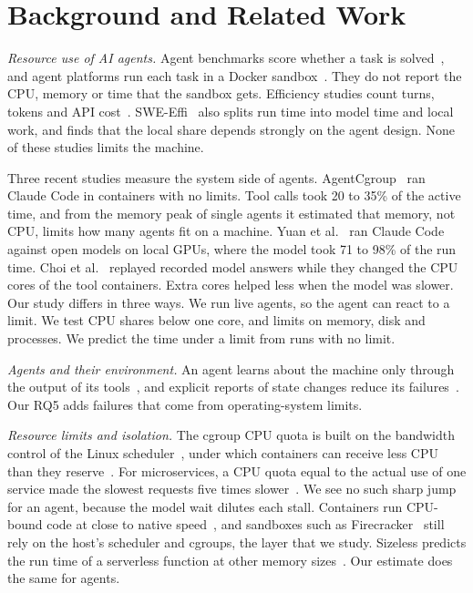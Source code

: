 \documentclass[sigconf,review,anonymous]{acmart}
\begin{document}
\section{Background and Related Work}



\emph{Resource use of AI agents.} Agent benchmarks score whether a task
is solved~\cite{jimenez2024,swebenchverified}, and agent platforms run
each task in a Docker sandbox~\cite{yang2024,wang2025}. They do not
report the CPU, memory or time that the sandbox gets. Efficiency studies
count turns, tokens and API cost~\cite{gao2026,lindenbauer2025,fan2025}.
SWE-Effi~\cite{fan2025} also splits run time into model time and local
work, and finds that the local share depends strongly on the agent
design. None of these studies limits the machine.

Three recent studies measure the system side of agents. AgentCgroup~\cite{agentcgroup} ran Claude Code
in containers with no limits. Tool calls took 20 to 35\% of the active
time, and from the memory peak of single agents it estimated that
memory, not CPU, limits how many agents fit on a machine. Yuan et
al.~\cite{yuan2026} ran Claude Code against open models on local GPUs,
where the model took 71 to 98\% of the run time. Choi et
al.~\cite{choi2026} replayed recorded model answers while they changed
the CPU cores of the tool containers. Extra cores helped less when the
model was slower. Our study differs in three ways. We run live agents, so the agent
can react to a limit. We test CPU shares below one core, and limits on
memory, disk and processes. We predict the time under a limit from runs
with no limit.

\emph{Agents and their environment.} An agent learns about the machine
only through the output of its tools~\cite{yang2024}, and explicit
reports of state changes reduce its failures~\cite{song2025}. Our RQ5
adds failures that come from operating-system limits.

\emph{Resource limits and isolation.} The cgroup CPU quota is built on
the bandwidth control of the Linux scheduler~\cite{turner2010,cgroupv2},
under which containers can receive less CPU than they
reserve~\cite{liu2021}. For microservices, a CPU quota equal to the actual use of one
service made the slowest requests five times
slower~\cite{shetty2025}. We see no such sharp jump for an agent,
because the model wait dilutes each stall. Containers run CPU-bound code
at close to native speed~\cite{felter2015}, and sandboxes such as
Firecracker~\cite{agache2020,anjali2020} still rely on the host's
scheduler and cgroups, the layer that we study. Sizeless predicts the
run time of a serverless function at other memory
sizes~\cite{eismann2021}. Our estimate does the same for agents.
\end{document}
